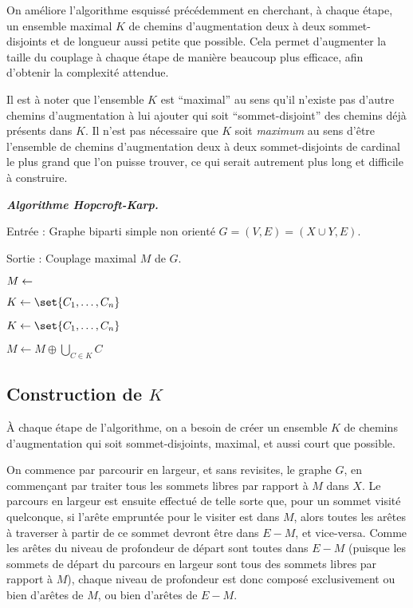  On améliore l'algorithme esquissé précédemment en cherchant, à chaque étape, un ensemble maximal $K$ de chemins d'augmentation deux à deux sommet-disjoints et de longueur aussi petite que possible. Cela permet d'augmenter la taille du couplage à chaque étape de manière beaucoup plus efficace, afin d'obtenir la complexité attendue.
 
 Il est à noter que l'ensemble $K$ est ``maximal'' au sens qu'il n'existe pas d'autre chemins d'augmentation à lui ajouter qui soit ``sommet-disjoint'' des chemins déjà présents dans $K$. Il n'est pas nécessaire que $K$ soit \emph{maximum} au sens d'être l'ensemble de chemins d'augmentation deux à deux sommet-disjoints de cardinal le plus grand que l'on puisse trouver, ce qui serait autrement plus long et difficile à construire.
 
 \SEP \emph{\bfseries Algorithme Hopcroft-Karp.}
    
    Entrée : Graphe biparti simple non orienté $G = (V,E) = (X \cup Y, E)$.
    
    Sortie : Couplage maximal $M$ de $G$.
    \bigskip
    
    $M \leftarrow \empty$
    
    $K \leftarrow \set{C_1,\dots,C_n}$
    
    
    
    
    \hspace{2em} $K \leftarrow \set{C_1,\dots,C_n}$
    
    \hspace{2em} $ M \leftarrow M \oplus \bigcup_{C \in K} C$
    
    
 \SEP
 
 \subsection{Construction de $K$}
 
 À chaque étape de l'algorithme, on a besoin de créer un ensemble $K$ de chemins d'augmentation qui soit sommet-disjoints, maximal, et aussi court que possible.
 
 On commence par parcourir en largeur, et sans revisites, le graphe $G$, en commençant par traiter tous les sommets libres par rapport à $M$ dans $X$. Le parcours en largeur est ensuite effectué de telle sorte que, pour un sommet visité quelconque, si l'arête empruntée pour le visiter est dans $M$, alors toutes les arêtes à traverser à partir de ce sommet devront être dans $E\minus M$, et vice-versa. Comme les arêtes du niveau de profondeur de départ sont toutes dans $E\minus M$ (puisque les sommets de départ du parcours en largeur sont tous des sommets libres par rapport à $M$), chaque niveau de profondeur est donc composé exclusivement ou bien d'arêtes de $M$, ou bien d'arêtes de $E\minus M$. 
 
